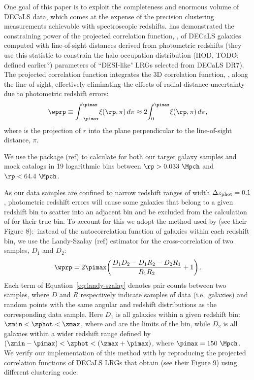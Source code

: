 \documentclass[twocolumn,apj,iop,tighten]{emulateapj2}
\begin{document}
One goal of this paper is to exploit the completeness and enormous volume of DECaLS data, which comes at the expense of the precision clustering measurements achievable with spectroscopic redshifts. \citet{zhou_etal20b} has demonstrated the constraining power of the projected correlation function, \wprp, of DECaLS galaxies computed with line-of-sight distances derived from photometric redshifts (they use this statistic to constrain the halo occupation distribution (HOD, TODO: defined earlier?) parameters of ``DESI-like" LRGs selected from DECaLS DR7). The projected correlation function integrates the 3D correlation function, \xir, along the line-of-sight, effectively eliminating the effects of radial distance uncertainty due to photometric redshift errors:
%
\begin{equation}
\wprp \equiv \int_{-\pimax}^{\pimax}\!\xi(\rp,\pi)\,d\pi \approx 2\!\int_0^{\pimax}\!\xi(\rp,\pi)\,d\pi,
\end{equation}
%
\noindent where \rp is the projection of $r$ into the plane perpendicular to the line-of-sight distance, $\pi$.

We use the \corrfunc package (ref) to calculate \wprp for both our target galaxy samples and mock catalogs in 19 logarithmic bins between ${\rp>0.033\ \Mpch}$ and ${\rp<64.4\ \Mpch}$.

As our data samples are confined to narrow redshift ranges of width ${\Delta z_{\rm phot} = 0.1}$, photometric redshift errors will cause some galaxies that belong to a given redshift bin to scatter into an adjacent bin and be excluded from the calculation of \wprp for their true bin. To account for this we adopt the method used by \citet{zhou_etal20b} (see their Figure 8):\ instead of the autocorrelation function of galaxies within each redshift bin, we use the Landy-Szalay (ref) estimator for the cross-correlation of two samples, $D_1$ and $D_2$:
%
\begin{equation}\label{eq:landy-szalay}
\wprp = 2\pimax\!\left(\frac{D_1D_2 - D_1R_2 - D_2R_1}{R_1R_2} + 1 \right).
\end{equation}
%
\noindent Each term of Equation~\ref{eq:landy-szalay} denotes pair counts between two samples, where $D$ and $R$ respectively indicate samples of data (i.e.\ galaxies) and random points with the same angular and redshift distributions as the corresponding data sample. Here $D_1$ is all galaxies within a given redshift bin: ${\zmin < \zphot < \zmax}$, where \zmin and \zmax are the limits of the bin, while $D_2$ is all galaxies within a wider redshift range defined by ${(\zmin-\pimax) < \zphot < (\zmax+\pimax)}$, where ${\pimax=150~\Mpch}$.
We verify our implementation of this method with \corrfunc by reproducing the projected correlation functions of DECaLS LRGs that \citet{zhou_etal20b} obtain (see their Figure 9) using different clustering code.
\end{document}
